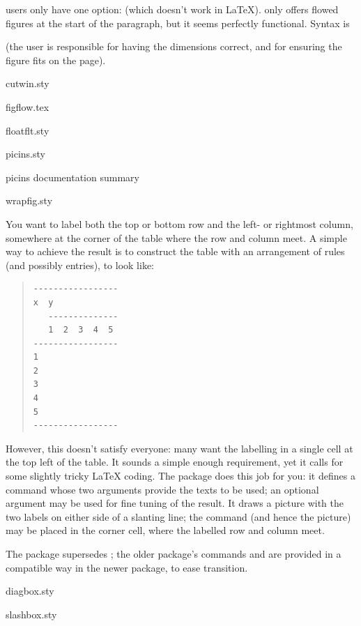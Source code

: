 \plaintex{} users only have one option:  (which
doesn't work in \LaTeX{}).   only offers flowed
figures at the start of the paragraph, but it seems perfectly
functional. Syntax is
\begin{quote}
\end{quote}
(the user is responsible for having the dimensions correct, and for
ensuring the figure fits on the page).
\begin{ctanrefs}
\item[cutwin.sty]
\item[figflow.tex]
\item[floatflt.sty]
\item[picins.sty]
\item[picins \nothtml{\rmfamily}documentation summary]
\item[wrapfig.sty]
\end{ctanrefs}


You want to label both the top or bottom row and the left- or
rightmost column, somewhere at the corner of the table where the row
and column meet.  A simple way to achieve the result is to construct
the table with an arrangement of rules (and possibly 
entries), to look like:
\begin{quote}
\begin{verbatim}
-----------------
x  y
   --------------
   1  2  3  4  5
-----------------
1
2
3
4
5
-----------------
\end{verbatim}
\end{quote}
However, this doesn't satisfy everyone: many want the labelling in a
single cell at the top left of the table.  It sounds a simple enough
requirement, yet it calls for some slightly tricky \LaTeX{} coding.
The  package does this job for you: it defines a
command  whose two arguments provide the texts to be
used; an optional argument may be used for fine tuning of the result.
It draws a picture with the two labels on either side of a slanting
line; the command (and hence the picture) may be placed in the corner
cell, where the labelled row and column meet.

The  package supersedes ; the older
package's commands  and  are provided
in a compatible way in the newer package, to ease transition.
\begin{ctanrefs}
\item[diagbox.sty]
\item[slashbox.sty]
\end{ctanrefs}


